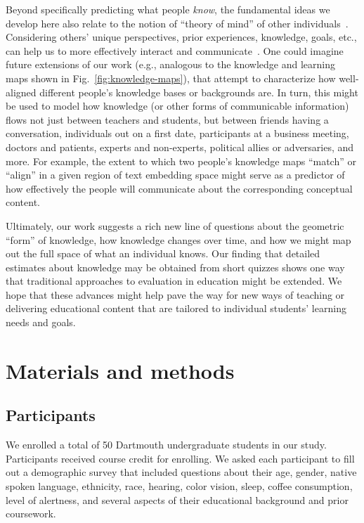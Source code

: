 \documentclass[10pt]{article}
\begin{document}
Beyond specifically predicting what people \textit{know}, the fundamental ideas
we develop here also relate to the notion of ``theory of mind'' of other
individuals~\citep{GoldWinn12, KansEtal15, Melt11}. Considering others' unique
perspectives, prior experiences, knowledge, goals, etc., can help us to more
effectively interact and communicate~\citep{ShaoEtal18, StepBaer06, Ratk18}.
One could imagine future extensions of our work (e.g., analogous to the
knowledge and learning maps shown in Fig.~\ref{fig:knowledge-maps}), that
attempt to characterize how well-aligned different people's knowledge bases or
backgrounds are. In turn, this might be used to model how knowledge (or other
forms of communicable information) flows not just between teachers and
students, but between friends having a conversation, individuals out on a first
date, participants at a business meeting, doctors and patients, experts and
non-experts, political allies or adversaries, and more. For example, the extent
to which two people's knowledge maps ``match'' or ``align'' in a given region
of text embedding space might serve as a predictor of how effectively the
people will communicate about the corresponding conceptual content.

Ultimately, our work suggests a rich new line of questions about the geometric
``form'' of knowledge, how knowledge changes over time, and how we might map
out the full space of what an individual knows. Our finding that detailed
estimates about knowledge may be obtained from short quizzes shows one way that
traditional approaches to evaluation in education might be extended. We hope
that these advances might help pave the way for new ways of teaching or
delivering educational content that are tailored to individual students'
learning needs and goals.

\section*{Materials and methods}

\subsection*{Participants}

We enrolled a total of 50 Dartmouth undergraduate students in our study.
Participants received course credit for enrolling. We asked each participant to
fill out a demographic survey that included questions about their age, gender,
native spoken language, ethnicity, race, hearing, color vision, sleep, coffee
consumption, level of alertness, and several aspects of their educational
background and prior coursework.
\end{document}
